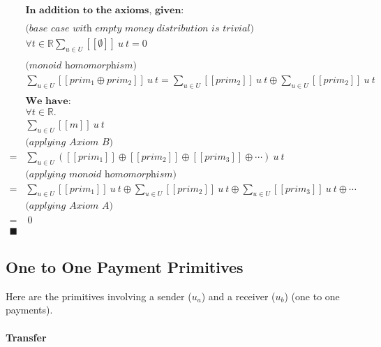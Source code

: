 \begin{equation}
    \begin{split}
        &\textbf{In addition to the axioms, given:} \\
        \\
        &\textit{(base case with empty money distribution is trivial)} \\
        &\forall t \in \mathbb{R} {\displaystyle \sum_{u \in U} [\![\emptyset]\!]\ u\ t = 0} \\
        \\
        &\textit{(monoid homomorphism)} \\
        &{\displaystyle \sum_{u \in U} [\![prim_1 \oplus prim_2]\!]\ u\ t} =
          {\displaystyle \sum_{u \in U} [\![prim_2]\!]\ u\ t} \oplus
          {\displaystyle \sum_{u \in U} [\![prim_2]\!]\ u\ t} \\
        \\
        &\textbf{We have:} \\
        &\forall t \in \mathbb{R}. \\
        &{\displaystyle \sum_{u \in U} [\![m]\!]\ u\ t} \\
        &\textit{(applying Axiom B)} \\
        = &{\displaystyle \sum_{u \in U}
            ([\![prim_1]\!] \oplus
            [\![prim_2]\!] \oplus
            [\![prim_3]\!]\oplus \dotsb)
        }\ u\ t
        \\
        &\textit{(applying monoid homomorphism)} \\
        = &{\displaystyle \sum_{u \in U} [\![prim_1]\!]\ u\ t} \oplus
        {\displaystyle \sum_{u \in U} [\![prim_2]\!]\ u\ t} \oplus
        {\displaystyle \sum_{u \in U} [\![prim_3]\!]\ u\ t} \oplus \dotsb
        \\
        &\textit{(applying Axiom A)} \\
        =&\ 0
        \\
        \blacksquare
    \end{split}
\end{equation}

\subsection{One to One Payment Primitives}

Here are the primitives involving a sender ($u_a$) and a receiver ($u_b$) (one to one payments).

\paragraph{Transfer}

